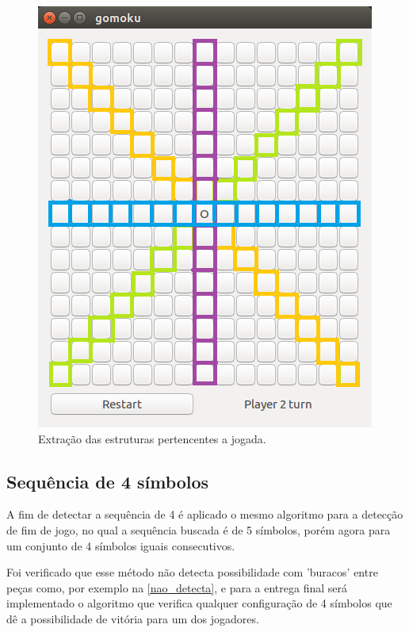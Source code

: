 \documentclass[
	article,			%
	11pt,				%
	oneside,			%
	a4paper,			%
	english,			%
	brazil,				%
	sumario=tradicional
	]{abntex2}
\begin{document}
\begin{figure}[htb]
    \caption{\label{extracao_estruturas}Extração das estruturas pertencentes a jogada.}
        \begin{center}
            \includegraphics[scale=0.75]{busca_de_vitoria.png}
        \end{center}
\end{figure}

\subsection{Sequência de 4 símbolos}

A fim de detectar a sequência de 4  é aplicado o mesmo algoritmo para a detecção de fim de jogo, no qual a sequência buscada é de 5 símbolos, porém agora para um conjunto de 4 símbolos iguais consecutivos.

Foi verificado que esse método não detecta possibilidade com 'buracos' entre peças como, por exemplo na \autoref{nao_detecta}, e para a entrega final será implementado o algoritmo que verifica qualquer configuração de 4 símbolos que dê a possibilidade de vitória para um dos jogadores.
\end{document}
